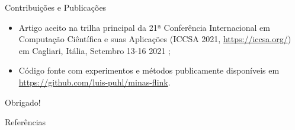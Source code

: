 \documentclass[aspectratio=1610,10pt]{beamer}
\begin{document}
\begin{frame}{Contribuições e Publicações}
  \begin{itemize}
    
    \item Artigo aceito na trilha principal da 21ª Conferência Internacional em
    Computação Ciêntífica e suas Aplicações (ICCSA 2021,
    \url{https://iccsa.org/}) em Cagliari, Itália, Setembro 13-16 2021
    \cite{Puhl2021};
    
    
    \item Código fonte com experimentos e métodos publicamente disponíveis em
    \url{https://github.com/luis-puhl/minas-flink}.
  
  \end{itemize}
\end{frame}

{\begin{frame}[standout]
  Obrigado!
\end{frame}}

\begin{frame}[allowframebreaks]{Referências}
  
\end{frame}

\appendix
\end{document}
